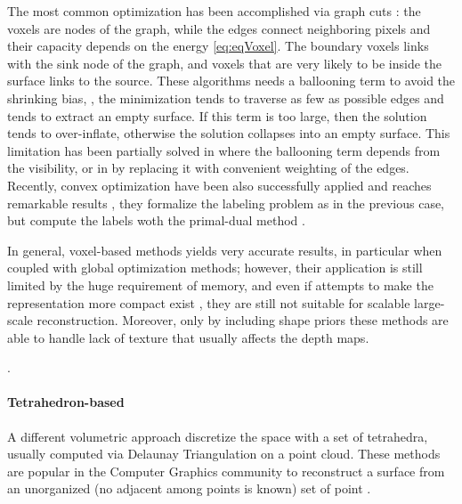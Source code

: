 The most common optimization has been accomplished via graph cuts \cite{vogiatzis2005multi,kolmogorov2002multi,hornung2006hierarchical,furukawa2006carved,mucke2011surface,hernandez2007probabilistic}: the voxels are nodes of the graph, while the edges connect neighboring pixels and their capacity depends on the energy \eqref{eq:eqVoxel}. The boundary voxels links with the sink node of the graph, and voxels that are very likely to be inside the surface links to the source.
These algorithms needs a ballooning term to avoid the shrinking bias, \ie, the minimization tends to traverse as few as possible edges and tends to extract an empty surface. If this term is too large, then the solution tends to over-inflate, otherwise the solution collapses into an empty surface.
This limitation has been partially solved in \cite{hernandez2007probabilistic} where the ballooning term depends  from the visibility, or in \cite{mucke2011surface} by replacing it with convenient weighting of the edges. 
Recently, convex optimization have been also successfully applied and reaches remarkable results
\cite{kolev2009continuous,kolev2010anisotropic,kostrikov2014probabilistic}, they formalize the labeling problem as in the previous case, but compute the labels woth the primal-dual method \cite{mehrotra1992implementation}.




In general, voxel-based methods yields very accurate results, in particular when coupled with global optimization methods; however, their application is still limited by the huge requirement of memory, and even if attempts to make the representation more compact exist \cite{steinbrucker2014volumetric,chen2013scalable,zeng2013octree}, they are still not suitable for scalable large-scale reconstruction.
Moreover, only by including shape priors these methods are able to handle lack of texture \cite{karimi2015segment} that usually affects the depth maps.


.
\paragraph{Tetrahedron-based}
\label{sec:tet-based}
A different volumetric approach discretize the space with a set of tetrahedra, usually computed via Delaunay Triangulation on a point cloud.
These methods are popular in the Computer Graphics community to reconstruct a surface from an unorganized (no adjacent among points is known) set of point \cite{amenta1999surface,amenta2001power,boissonnat1984geometric,dey2004provable,kolluri2004spectral}. 

